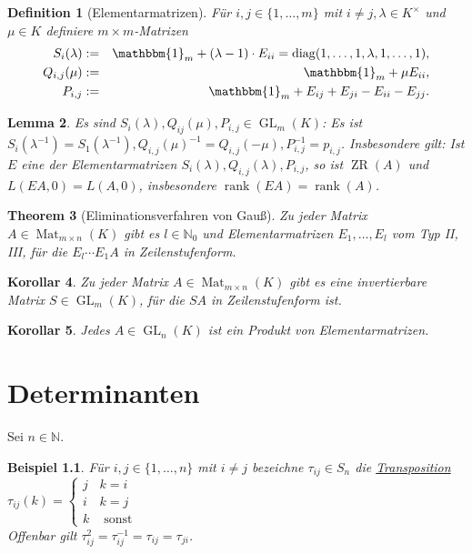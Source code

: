 \documentclass[ngerman,a4paper]{report}
\theoremstyle{changebreak}
\newtheorem{theorem}{Theorem}[section]
\newtheorem{example}[theorem]{Beispiel}
\newtheorem{corollar}[theorem]{Korollar}
\newtheorem{lemma}[theorem]{Lemma}
\newtheorem{definition}[theorem]{Definition}
\newcommand{\begriff}[2][]{\uline{#2}\index{#1#2}}
\DeclareMathOperator{\Mat}{Mat}
\DeclareMathOperator{\diag}{diag}
\DeclareMathOperator{\GL}{GL}
\DeclareMathOperator{\rk}{rank}
\DeclareMathOperator{\ZR}{ZR}
\begin{document}
\begin{definition}[Elementarmatrizen]
    Für $i,j \in \{1,\dots,m\}$ mit $i\neq j, \lambda\in K^{\times}$ und $\mu \in K$ definiere $m\times m$-Matrizen
    \begin{eqnarray*}
        S_i(\lambda) &:=& \mathbbm{1}_m +(\lambda -1)\cdot E_{ii} = \diag(1,\dots,1,\lambda,1,\dots,1),\\
            Q_{i,j}(\mu) &:=& \mathbbm{1}_m + \mu E_{ii},\\
            P_{i,j} &:=& \mathbbm{1}_m + E_{ij} + E_{ji} - E_{ii} - E_{jj}.
    \end{eqnarray*}
\end{definition}

\begin{lemma}
    Es sind $S_i(\lambda), Q_{ij}(\mu), P_{i,j}\in \GL_m(K)$: Es ist $S_i(\lambda^{-1})=S_{1}(\lambda^{-1}), Q_{i,j}(\mu)^{-1} = Q_{i,j}(-\mu),P_{i,j}^{-1}=p_{i,j}$. Insbesondere gilt: Ist $E$ eine der Elementarmatrizen $S_i(\lambda), Q_{i,j}(\lambda),P_{i,j}$, so ist $\ZR(A)$ und $L(EA,0) = L(A,0)$, insbesondere $\rk(EA)=\rk(A)$.
\end{lemma}

\begin{theorem}[Eliminationsverfahren von Gauß]
    Zu jeder Matrix $A\in \Mat_{m\times n}(K)$ gibt es $l \in \mathbb{N}_{0}$ und Elementarmatrizen $E_1,\dots,E_l$ vom Typ II, III, für die $E_l\cdots E_1 A$ in Zeilenstufenform.
\end{theorem}

\addtocounter{theorem}{1}

\begin{corollar}
    Zu jeder Matrix $A\in \Mat_{m\times n}(K)$ gibt es eine invertierbare Matrix $S\in \GL_m(K)$, für die $SA$ in Zeilenstufenform ist.
\end{corollar}

\addtocounter{theorem}{1}

\begin{corollar}
    Jedes $A\in \GL_n(K)$ ist ein Produkt von Elementarmatrizen.
\end{corollar}

\chapter{Determinanten}
Sei $n \in \mathbb{N}$.

\addtocounter{section}{1}

\begin{example}
    Für $i,j \in \{1,\dots,n\}$ mit $i\neq j$ bezeichne $\tau_{ij} \in S_n$ die \begriff{Transposition}
    $ \tau_{ij}(k)=
    \begin{cases}
        j & \text{$k=i$}\\
        i & \text{$k=j$}\\
        k & \text{ sonst}
    \end{cases}$\\
    Offenbar gilt $\tau_{ij}^2 = \tau_{ij}^{-1} = \tau_{ij} = \tau_{ji}$.
\end{example}
\end{document}
